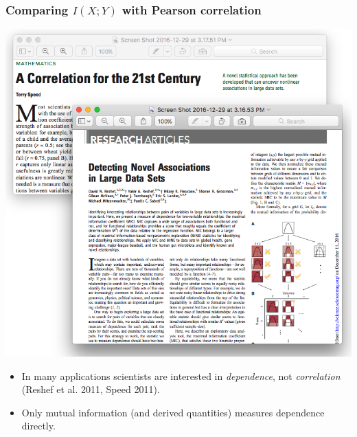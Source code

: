 \documentclass{beamer}
\begin{document}
\begin{frame}
\frametitle{Comparing $I(X; Y)$ with Pearson correlation}
\begin{center}
\includegraphics[scale = 0.2]{speed_reshef.png}
\end{center}
\begin{itemize}
\item In many applications scientists are interested in \emph{dependence}, not \emph{correlation} (Reshef et al. 2011, Speed 2011). \pause
\item Only mutual information (and derived quantities) measures dependence directly.
\end{itemize}
\end{frame}

\end{document}
